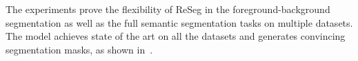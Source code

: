 The experiments prove the flexibility of ReSeg in the foreground-background
segmentation as well as the full semantic segmentation tasks on multiple
datasets. The model achieves state of the art on all the datasets and generates
convincing segmentation masks, as shown in~.
